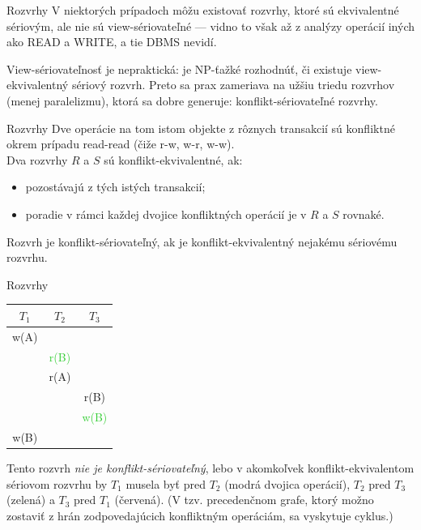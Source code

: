 \documentclass[12pt]{beamer}
\def\blue#1{\textcolor{Cerulean}{#1}}
\def\green#1{\textcolor{LimeGreen}{#1}}
\begin{document}
\begin{frame}[fragile]{Rozvrhy}
V niektorých prípadoch môžu existovať rozvrhy, ktoré sú ekvivalentné sériovým,
ale nie sú view-sériovateľné --- vidno to však až z analýzy operácií iných ako READ a WRITE, a tie DBMS nevidí.

View-sériovateľnosť je nepraktická: je NP-ťažké rozhodnúť, či existuje view-ekvivalentný sériový rozvrh.
Preto sa prax zameriava na užšiu triedu rozvrhov (menej paralelizmu),
ktorá sa dobre generuje: konflikt-sériovateľné rozvrhy.
\end{frame}


\begin{frame}[fragile]{Rozvrhy}
Dve operácie na tom istom objekte z rôznych transakcií sú \alert{konfliktné} okrem prípadu read-read (čiže r-w, w-r, w-w).\\
Dva rozvrhy $R$ a $S$ sú \alert{konflikt-ekvivalentné}, ak:
\begin{itemize}
\item pozostávajú z tých istých transakcií;
\item poradie v rámci každej dvojice konfliktných operácií je v $R$ a $S$ rovnaké.
\end{itemize}
Rozvrh je \alert{konflikt-sériovateľný}, ak je konflikt-ekvivalentný nejakému sériovému rozvrhu.
\end{frame}


\begin{frame}[fragile]{Rozvrhy}
\begin{minipage}{.4\pdfpagewidth}
\begin{tabular}{c|c|c}
  $T_1$         & $T_2$         & $T_3$           \\\hline\hline
  \blue{w(A)}   &               &                 \\\hline
                & \green{r(B)}  &                 \\\hline
                & \blue{r(A)}   &                 \\\hline
                &               &  \alert{r(B)}   \\\hline
                &               &  \green{w(B)}   \\\hline
  \alert{w(B)}  &               &                 \\
\end{tabular}
\end{minipage}
\begin{minipage}{.4\pdfpagewidth}
Tento rozvrh \emph{nie je konflikt-sériovateľný}, lebo v akomkoľvek konflikt-ekvivalentom sériovom rozvrhu
by $T_1$ musela byť pred $T_2$ (modrá dvojica operácií), $T_2$ pred $T_3$ (zelená) a $T_3$ pred $T_1$ (červená).
(V tzv. precedenčnom grafe, ktorý možno zostaviť z hrán zodpovedajúcich konfliktným operáciám, sa vyskytuje cyklus.)
\end{minipage}
\\[5mm]
\end{frame}
\end{document}
